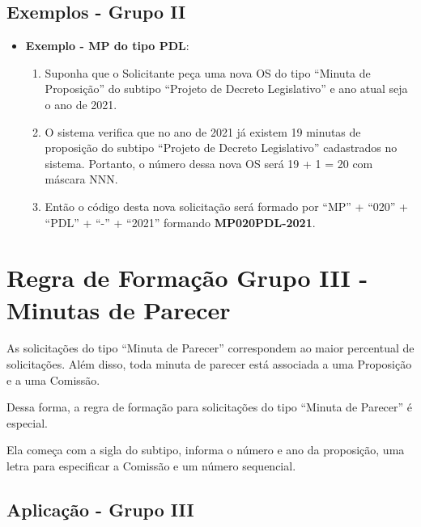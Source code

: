 \subsection{Exemplos - Grupo II}

\begin{itemize}
	\item \textbf{Exemplo - MP do tipo PDL}:
	
	\begin{enumerate}
	\item Suponha que o Solicitante peça uma nova OS do tipo ``Minuta de Proposição'' do subtipo ``Projeto de Decreto Legislativo''  e ano atual seja o ano de 2021.
	
	\item O sistema verifica que no ano de 2021 já existem 19 minutas de proposição do subtipo ``Projeto de Decreto Legislativo'' cadastrados no sistema. Portanto, o número dessa nova OS será 19 + 1 = 20 com máscara NNN.
	
	\item Então o código desta nova solicitação será formado por ``MP'' + ``020'' + ``PDL'' + ``-'' + ``2021'' formando \textbf{MP020PDL-2021}.			
	\end{enumerate}

\end{itemize}


\section{Regra de Formação Grupo III - Minutas de Parecer}

As solicitações do tipo ``Minuta de Parecer'' correspondem ao maior percentual de solicitações. Além disso, toda minuta de parecer está associada a uma Proposição e a uma Comissão.

Dessa forma, a regra de formação para solicitações do tipo ``Minuta de Parecer'' é especial.  

Ela começa com a sigla do subtipo, informa o número e ano da proposição, uma letra para especificar a Comissão e um número sequencial.  

\subsection{Aplicação - Grupo III}

